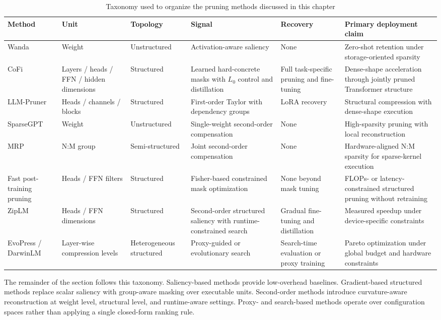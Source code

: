 \begin{table}[htbp]
	\centering
	\caption{Taxonomy used to organize the pruning methods discussed in this chapter}
	\label{tab:pruning_taxonomy}
	\begin{tabularx}{\textwidth}{l >{\raggedright\arraybackslash}X >{\raggedright\arraybackslash}X >{\raggedright\arraybackslash}X >{\raggedright\arraybackslash}X >{\raggedright\arraybackslash}X}
		\toprule
		\textbf{Method} & \textbf{Unit} & \textbf{Topology} & \textbf{Signal} & \textbf{Recovery} & \textbf{Primary deployment claim} \\
		\midrule
		Wanda & Weight & Unstructured & Activation-aware saliency & None & Zero-shot retention under storage-oriented sparsity \\
		CoFi & Layers / heads / FFN / hidden dimensions & Structured & Learned hard-concrete masks with $L_0$ control and distillation & Full task-specific pruning and fine-tuning & Dense-shape acceleration through jointly pruned Transformer structure \\
		LLM-Pruner & Heads / channels / blocks & Structured & First-order Taylor with dependency groups & LoRA recovery & Structural compression with dense-shape execution \\
		SparseGPT & Weight & Unstructured & Single-weight second-order compensation & None & High-sparsity pruning with local reconstruction \\
		MRP & N:M group & Semi-structured & Joint second-order compensation & None & Hardware-aligned N:M sparsity for sparse-kernel execution \\
		Fast post-training pruning & Heads / FFN filters & Structured & Fisher-based constrained mask optimization & None beyond mask tuning & FLOPs- or latency-constrained structured pruning without retraining \\
		ZipLM & Heads / FFN dimensions & Structured & Second-order structured saliency with runtime-constrained search & Gradual fine-tuning and distillation & Measured speedup under device-specific constraints \\
		EvoPress / DarwinLM & Layer-wise compression levels & Heterogeneous structured & Proxy-guided or evolutionary search & Search-time evaluation or proxy training & Pareto optimization under global budget and hardware constraints \\
		\bottomrule
	\end{tabularx}
\end{table}

The remainder of the section follows this taxonomy. Saliency-based methods provide low-overhead baselines. Gradient-based structured methods replace scalar saliency with group-aware masking over executable units. Second-order methods introduce curvature-aware reconstruction at weight level, structural level, and runtime-aware settings. Proxy- and search-based methods operate over configuration spaces rather than applying a single closed-form ranking rule.

